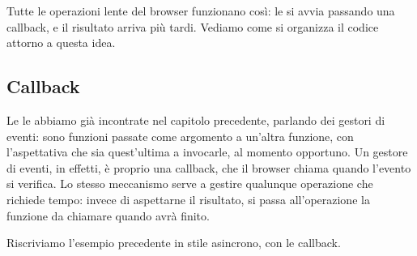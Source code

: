 
Tutte le operazioni lente del browser funzionano così: le si avvia passando una
callback, e il risultato arriva più tardi. Vediamo come si organizza il codice
attorno a questa idea.

\subsection{Callback}

Le  le abbiamo già incontrate nel capitolo precedente, parlando
dei gestori di eventi: sono funzioni passate come argomento a un'altra
funzione, con l'aspettativa che sia quest'ultima a invocarle, al momento
opportuno. Un gestore di eventi, in effetti, è proprio una callback, che il
browser chiama quando l'evento si verifica. Lo stesso meccanismo serve a
gestire qualunque operazione che richiede tempo: invece di aspettarne il
risultato, si passa all'operazione la funzione da chiamare quando avrà finito.

Riscriviamo l'esempio precedente in stile asincrono, con le callback.

